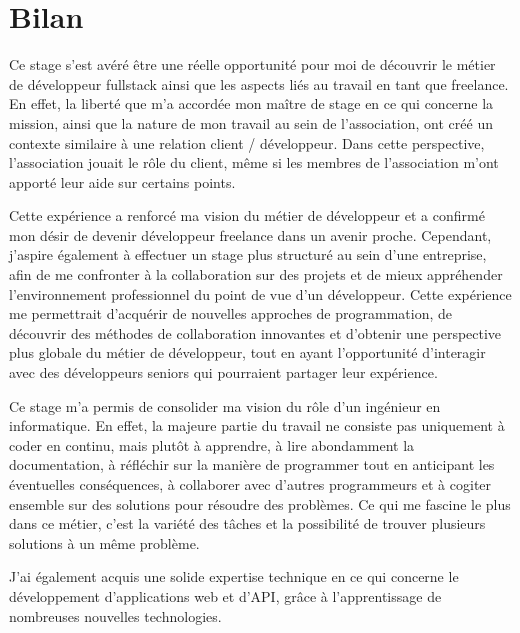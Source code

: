 \section{Bilan}



Ce stage s'est avéré être une réelle opportunité pour moi de découvrir le métier de développeur fullstack ainsi que les aspects liés au travail en tant que freelance. En effet, la liberté que m'a accordée mon maître de stage en ce qui concerne la mission, ainsi que la nature de mon travail au sein de l'association, ont créé un contexte similaire à une relation client / développeur. Dans cette perspective, l'association jouait le rôle du client, même si les membres de l'association m'ont apporté leur aide sur certains points.

Cette expérience a renforcé ma vision du métier de développeur et a confirmé mon désir de devenir développeur freelance dans un avenir proche. Cependant, j'aspire également à effectuer un stage plus structuré au sein d'une entreprise, afin de me confronter à la collaboration sur des projets et de mieux appréhender l'environnement professionnel du point de vue d'un développeur. Cette expérience me permettrait d'acquérir de nouvelles approches de programmation, de découvrir des méthodes de collaboration innovantes et d'obtenir une perspective plus globale du métier de développeur, tout en ayant l'opportunité d'interagir avec des développeurs seniors qui pourraient partager leur expérience.

\medskip

Ce stage m'a permis de consolider ma vision du rôle d'un ingénieur en informatique. En effet, la majeure partie du travail ne consiste pas uniquement à coder en continu, mais plutôt à apprendre, à lire abondamment la documentation, à réfléchir sur la manière de programmer tout en anticipant les éventuelles conséquences, à collaborer avec d'autres programmeurs et à cogiter ensemble sur des solutions pour résoudre des problèmes. Ce qui me fascine le plus dans ce métier, c'est la variété des tâches et la possibilité de trouver plusieurs solutions à un même problème.

J'ai également acquis une solide expertise technique en ce qui concerne le développement d'applications web et d'API, grâce à l'apprentissage de nombreuses nouvelles technologies.

